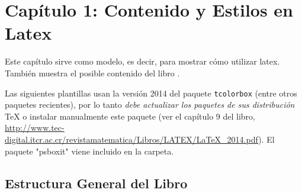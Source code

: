 \chapter{Capítulo 1: Contenido y Estilos en Latex}
Este capítulo sirve como modelo, es decir, para mostrar cómo utilizar latex. También muestra el posible contenido del libro \cite{villalobos2010diseno}.


\begin{caja}[Advertencia.]
	Las siguientes plantillas usan la versión 2014 del paquete
	\verb+tcolorbox+ (entre otros paquetes recientes),  por lo tanto {\it debe actualizar los paquetes de sus distribución} \TeX{} o instalar manualmente este paquete (ver el capítulo 9 del libro, \url{http://www.tec-digital.itcr.ac.cr/revistamatematica/Libros/LATEX/LaTeX_2014.pdf}). El paquete "psboxit" viene incluido en la carpeta.
\end{caja}



\section{Estructura General del Libro}

